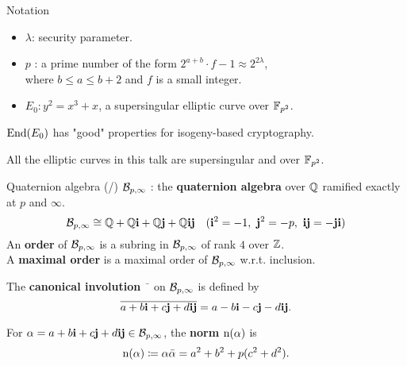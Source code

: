 
\begin{frame}{Notation}
    \begin{itemize}
        \setlength{\itemsep}{10pt}
        \item $\lambda$: security parameter.
        \item $p$ : a prime number of the form $2^{a + b} \cdot f - 1 \approx 2^{2\lambda}$,\\[3pt]
                where $b \leq a \leq b + 2$ and $f$ is a small integer.
        \item $E_0 : y^2 = x^3 + x$, a supersingular elliptic curve over $\mathbb{F}_{p^2}$.
    \end{itemize}

    \vspace{10pt}
    $\mathrm{End}(E_0)$ has "good" properties for isogeny-based cryptography.

    \vspace{20pt}
    All the elliptic curves in this talk are supersingular and over $\mathbb{F}_{p^2}$.
\end{frame}

\newcommand*{\quatotal}{\total{cnt_quat}}
\begin{frame}{Quaternion algebra (/\quatotal{})}
    $\mathcal{B}_{p,\infty}$ : the \textbf{quaternion algebra} over $\mathbb{Q}$ ramified exactly at $p$ and $\infty$.
    $$\mathcal{B}_{p,\infty} \cong \mathbb{Q} + \mathbb{Q}\mathbf{i} + \mathbb{Q}\mathbf{j} + \mathbb{Q}\mathbf{i}\mathbf{j} \quad (\mathbf{i}^2 = -1,\ \mathbf{j}^2 = -p,\ \mathbf{i}\mathbf{j} = -\mathbf{j}\mathbf{i})$$
    An \textbf{order} of $\mathcal{B}_{p,\infty}$ is a subring in $\mathcal{B}_{p,\infty}$ of rank $4$ over $\mathbb{Z}$.\\
    A \textbf{maximal order} is a maximal order of $\mathcal{B}_{p,\infty}$ w.r.t. inclusion.

    \vspace{10pt}
    The \textbf{canonical involution} $\bar{\phantom{a}}$ on $\mathcal{B}_{p,\infty}$ is defined by
    $$\overline{a + b\mathbf{i} + c\mathbf{j} + d\mathbf{i}\mathbf{j}} = a - b\mathbf{i} - c\mathbf{j} - d\mathbf{i}\mathbf{j}.$$

    For $\alpha = a + b\mathbf{i} + c\mathbf{j} + d\mathbf{i}\mathbf{j} \in \mathcal{B}_{p,\infty}$,
    the \textbf{norm} $\mathrm{n}(\alpha)$ is
    $$\mathrm{n}(\alpha) \coloneqq \alpha\bar{\alpha} = a^2 + b^2 + p(c^2 + d^2).$$
\end{frame}

